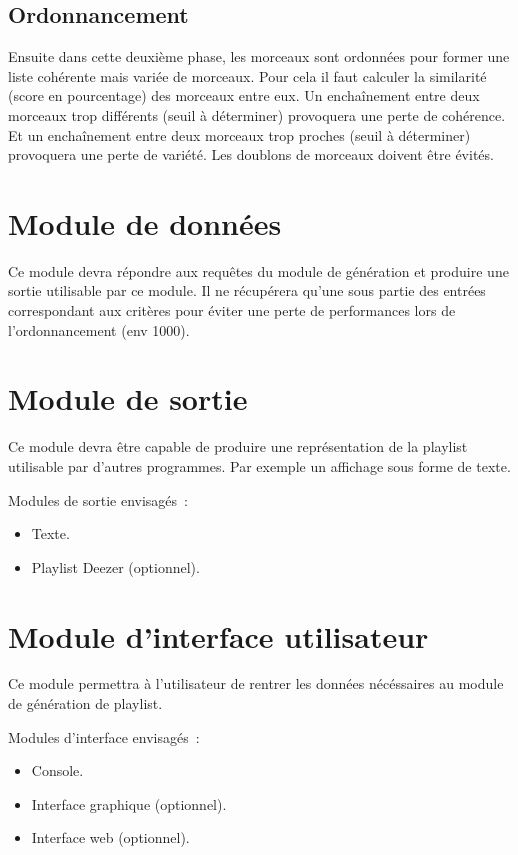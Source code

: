 \documentclass{article}
\begin{document}
\subsection{Ordonnancement}

Ensuite dans cette deuxième phase, les morceaux sont ordonnées pour former une
liste cohérente mais variée de morceaux. Pour cela il faut calculer la
similarité (score en pourcentage) des morceaux entre eux. Un enchaînement
entre deux morceaux trop différents (seuil à déterminer) provoquera une perte
de cohérence. Et un enchaînement entre deux morceaux trop proches (seuil à
déterminer) provoquera une perte de variété. Les doublons de morceaux doivent
être évités.

\section{Module de données}

Ce module devra répondre aux requêtes du module de génération et produire une
sortie utilisable par ce module. Il ne récupérera qu’une sous partie des
entrées correspondant aux critères pour éviter une perte de performances lors
de l'ordonnancement (env 1000).

\section{Module de sortie}

Ce module devra être capable de produire une représentation de la playlist
utilisable par d’autres programmes. Par exemple un affichage sous forme de
texte.

Modules de sortie envisagés~:
\begin{itemize}
\item Texte.
\item Playlist Deezer (optionnel).
\end{itemize}

\section{Module d'interface utilisateur}

Ce module permettra à l’utilisateur de rentrer les données nécéssaires au
module de génération de playlist.

Modules d'interface envisagés~:
\begin{itemize}
\item Console.
\item Interface graphique (optionnel).
\item Interface web (optionnel).
\end{itemize}
\end{document}
